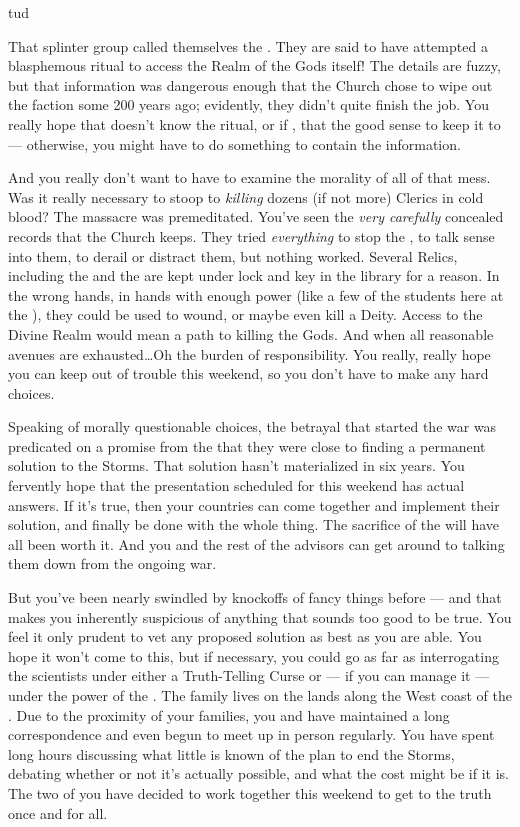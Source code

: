 tud\documentclass[char]{GL2020}
\begin{document}
That splinter group called themselves the \cDisneySect{}. They are said to have attempted a blasphemous ritual to access the Realm of the Gods itself! The details are fuzzy, but that information was dangerous enough that the Church chose to wipe out the faction some 200 years ago; evidently, they didn't quite finish the job. You really hope that \cDisney{} doesn't know the ritual, or if \cDisney{\theydo}, that \cDisney{\theyhave} the good sense to keep it to \cDisney{\themself} — otherwise, you might have to do something to contain the information. 

And you really don’t want to have to examine the morality of all of that mess. Was it really necessary to stoop to \emph{killing} dozens (if not more) Clerics in cold blood? The massacre was premeditated. You’ve seen the \emph{very carefully} concealed records that the Church keeps. They tried \emph{everything} to stop the \cDisneySect{}, to talk sense into them, to derail or distract them, but nothing worked. Several Relics, including the \iScythe{} and the \iNet{} are kept under lock and key in the \pSc{} library for a reason. In the wrong hands, in hands with enough power (like a few of the students here at the \pSchool{}), they could be used to wound, or maybe even kill a Deity. Access to the Divine Realm would mean a path to killing the Gods. And when all reasonable avenues are exhausted\ldots Oh the burden of responsibility. You really, really hope you can keep \cDisney{} out of trouble this weekend, so you don’t have to make any hard choices.

Speaking of morally questionable choices, the betrayal that started the war was predicated on a promise from the \pTech{} that they were close to finding a permanent solution to the Storms. That solution hasn’t materialized in six years. You fervently hope that the presentation scheduled for this weekend has actual answers.  If it's true, then your countries can come together and implement their solution, and finally be done with the whole thing. The sacrifice of the \pShip{} will have all been worth it. And you and the rest of the advisors can get around to talking them down from the ongoing war.

But you've been nearly swindled by knockoffs of fancy things before — and that makes you inherently suspicious of anything that sounds too good to be true. You feel it only prudent to vet any proposed solution as best as you are able. You hope it won’t come to this, but if necessary, you could go as far as interrogating the scientists under either a Truth-Telling Curse or — if you can manage it — under the power of the \iLariat{}. The \cCurse{\formal} family lives on the \cHedonist{\formal} lands along the West coast of the \pFarm{}. Due to the proximity of your families, you and \cCurse{\full} have maintained a long correspondence and even begun to meet up in person regularly. You have spent long hours discussing what little is known of the \pTech{} plan to end the Storms, debating whether or not it's actually possible, and what the cost might be if it is. The two of you have decided to work together this weekend to get to the truth once and for all. 
\end{document}
